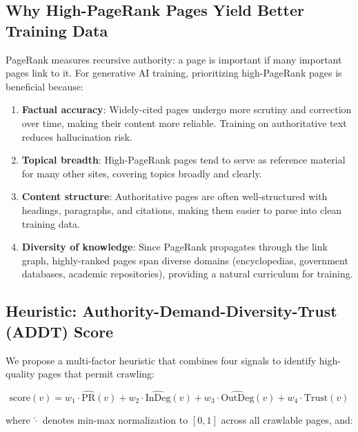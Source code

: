 \documentclass{article}
\begin{document}
\subsection{Why High-PageRank Pages Yield Better Training Data}

PageRank measures recursive authority: a page is important if many important pages link to it. For generative AI training, prioritizing high-PageRank pages is beneficial because:

\begin{enumerate}
    \item \textbf{Factual accuracy}: Widely-cited pages undergo more scrutiny and correction over time, making their content more reliable. Training on authoritative text reduces hallucination risk.
    \item \textbf{Topical breadth}: High-PageRank pages tend to serve as reference material for many other sites, covering topics broadly and clearly.
    \item \textbf{Content structure}: Authoritative pages are often well-structured with headings, paragraphs, and citations, making them easier to parse into clean training data.
    \item \textbf{Diversity of knowledge}: Since PageRank propagates through the link graph, highly-ranked pages span diverse domains (encyclopedias, government databases, academic repositories), providing a natural curriculum for training.
\end{enumerate}

\subsection{Heuristic: Authority-Demand-Diversity-Trust (ADDT) Score}

We propose a multi-factor heuristic that combines four signals to identify high-quality pages that permit crawling:

\begin{equation}
    \text{score}(v) = w_1 \cdot \widehat{\text{PR}}(v) + w_2 \cdot \widehat{\text{InDeg}}(v) + w_3 \cdot \widehat{\text{OutDeg}}(v) + w_4 \cdot \text{Trust}(v)
\end{equation}

where $\widehat{\cdot}$ denotes min-max normalization to $[0, 1]$ across all crawlable pages, and:
\end{document}
